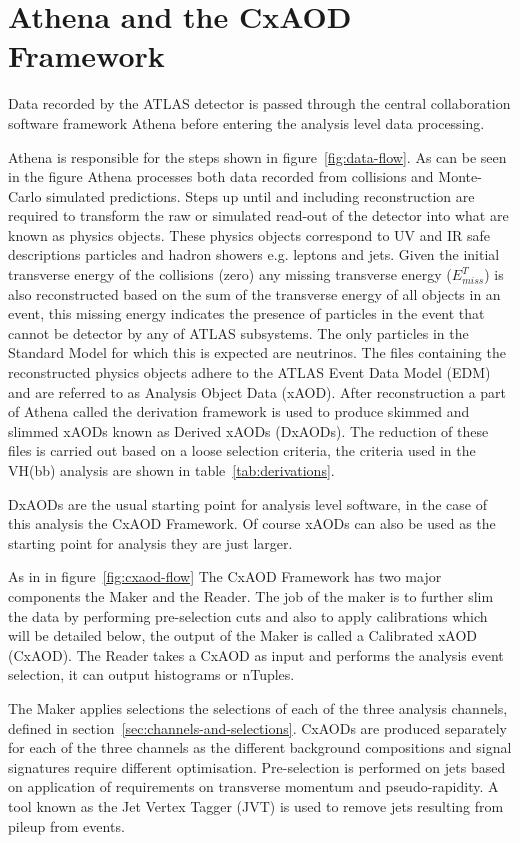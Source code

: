 \section{Athena and the CxAOD Framework}
\label{sec:cxaod}
Data recorded by the ATLAS detector is passed through the central collaboration
software framework Athena before entering the analysis level data processing.

Athena is responsible for the steps shown in figure~\ref{fig:data-flow}. As can
be seen in the figure Athena processes both data recorded from collisions and
Monte-Carlo simulated predictions. Steps up until and including reconstruction
are required to transform the raw or simulated read-out of the detector into
what are known as physics objects. These physics objects correspond to UV and IR
safe descriptions particles and hadron showers e.g. leptons and jets. Given the
initial transverse energy of the collisions (zero) any missing transverse energy
($E^T_{miss}$) is also reconstructed based on the sum of the transverse energy
of all objects in an event, this missing energy indicates the presence of
particles in the event that cannot be detector by any of ATLAS subsystems. The
only particles in the Standard Model for which this is expected are neutrinos.
The files containing the reconstructed physics objects adhere to the ATLAS Event
Data Model (EDM) and are referred to as Analysis Object Data (xAOD). After
reconstruction a part of Athena called the derivation framework is used to
produce skimmed and slimmed xAODs known as Derived xAODs (DxAODs). The reduction
of these files is carried out based on a loose selection criteria, the criteria
used in the VH(bb) analysis are shown in table~\ref{tab:derivations}.

DxAODs are the usual starting point for analysis level software, in the case of
this analysis the CxAOD Framework. Of course xAODs can also be used as the
starting point for analysis they are just larger.

As in in figure~\ref{fig:cxaod-flow} The CxAOD Framework has two major
components the Maker and the Reader. The job of the maker is to further slim the
data by performing pre-selection cuts and also to apply calibrations which will
be detailed below, the output of the Maker is called a Calibrated xAOD (CxAOD).
The Reader takes a CxAOD as input and performs the analysis event selection, it
can output histograms or nTuples.

The Maker applies selections the selections of each of the three analysis
channels, defined in section~\ref{sec:channels-and-selections}. CxAODs are
produced separately for each of the three channels as the different background
compositions and signal signatures require different optimisation. Pre-selection is
performed on jets based on application of requirements on transverse momentum and
pseudo-rapidity. A tool known as the Jet Vertex Tagger (JVT) is used to remove
jets resulting from pileup from events.

